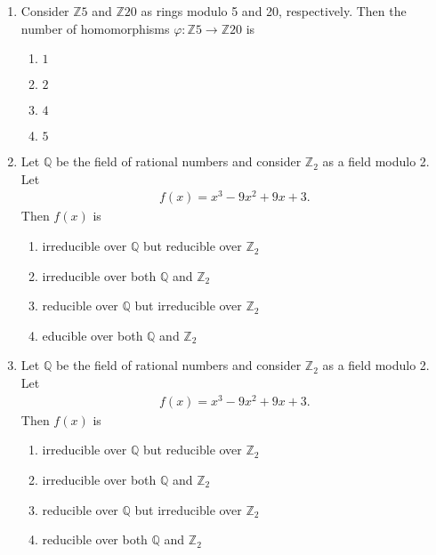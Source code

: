 \documentclass[journal]{IEEEtran}
\numberwithin{equation}{enumi}
\numberwithin{figure}{enumi}
\begin{document}
\begin{enumerate}
    

\item Consider $\mathbb{Z}5$ and $\mathbb{Z}{20}$ as rings modulo 5 and 20, respectively. Then the number of homomorphisms $\varphi: \mathbb{Z}5 \to \mathbb{Z}{20}$ is
\hfill{}
\begin{multicols}{4}
\begin{enumerate}
    \item $1$
    \item $2$
    \item $4$
    \item $5$
\end{enumerate}
\end{multicols}


\item Let $\mathbb{Q}$ be the field of rational numbers and consider $\mathbb{Z}_2$ as a field modulo 2. Let
    \begin{align*}
    f(x) = x^3 - 9x^2 + 9x + 3.
    \end{align*}
    Then $f(x)$ is
  \hfill{} 
\begin{enumerate}   
  \item irreducible over $\mathbb{Q}$ but reducible over $\mathbb{Z}_2$
  \item irreducible over both $\mathbb{Q}$ and $\mathbb{Z}_2$
  \item reducible over $\mathbb{Q}$ but irreducible over $\mathbb{Z}_2$
  \item educible over both $\mathbb{Q}$ and $\mathbb{Z}_2$
 \end{enumerate}




\item Let $\mathbb{Q}$ be the field of rational numbers and consider $\mathbb{Z}_2$ as a field modulo 2. Let
    \begin{align*}
    f(x) = x^3 - 9x^2 + 9x + 3.
    \end{align*}
    Then $f(x)$ is
   \hfill{}  
    \begin{enumerate}
        
       \item irreducible over $\mathbb{Q}$ but reducible over $\mathbb{Z}_2$
        \item irreducible over both $\mathbb{Q}$ and $\mathbb{Z}_2$
        \item reducible over $\mathbb{Q}$ but irreducible over $\mathbb{Z}_2$
        \item reducible over both $\mathbb{Q}$ and $\mathbb{Z}_2$
    \end{enumerate}
 


\end{enumerate}
\end{document}
